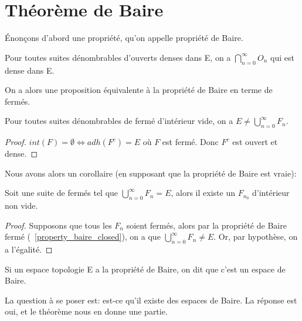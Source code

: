 \chapter{Théorème de Baire}

Énonçons d'abord une propriété, qu'on appelle propriété de Baire.

\begin{propriete} 
\label{property_baire_open}
	Pour toutes suites dénombrables d'ouverts denses dans E, on a $\displaystyle
	\bigcap_{n = 0}^{\infty} O_{n}$ qui est dense dans E.
\end{propriete}

On a alors une proposition équivalente à la propriété de Baire en terme de
fermés.

\begin{propriete} 
\label{property_baire_closed}
	Pour toutes suites dénombrables de fermé d'intérieur vide, on a $E \neq
	\displaystyle \bigcup_{n = 0}^{\infty} F_{n}$.
\end{propriete}

\begin{proof}
	$int(F) = \emptyset \Leftrightarrow adh(F^{c}) = E$ où $F$ est fermé. Donc
	$F^{c}$ est ouvert et dense.
\end{proof}

Nous avons alors un corollaire (en supposant que la propriété de Baire est
vraie):

\begin{corollary}
\label{corollary_baire_int_non_empty}
	Soit une suite  de fermés tel que $\displaystyle
	\bigcup_{n = 0}^{\infty}{F_{n}} = E$, alors il existe un $F_{n_{0}}$
	d'intérieur non vide.
\end{corollary}

\begin{proof}
	Supposons que tous les $F_{n}$ soient fermés, alors par la
	propriété de Baire fermé (~\ref{property_baire_closed}), on a que
	$\displaystyle \bigcup_{n = 0}^{\infty}{F_{n}} \neq E$. Or, par hypothèse,
	on a l'égalité.
\end{proof}

\begin{definition} 
	Si un espace topologie E a la propriété de Baire, on dit que c'est un espace
	de Baire.
\end{definition}

La question à se poser est: est-ce qu'il existe des espaces de Baire. La
réponse est oui, et le théorème nous en donne une partie.

